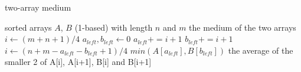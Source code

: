 \documentclass{article}
\begin{document}
	\begin{algorithm}[!h]
		\caption{two-array medium}  
		\label{whatever}  
		\begin{algorithmic}
			\Require  
			sorted arrays $A$, $B$ (1-based) with length $n$ and $m$
			\Ensure  
			the medium of the two arrays 
			\State $i\gets (m+n+1)/4$
			\State $a_{left}, b_{left}\gets 0$
			\State $a_{left} += i+1$
			\Else  
			\State $b_{left} += i+1$
			\EndIf
			\State $i\gets(n+m-a_{left}-b_{left}+1)/4$
			\EndWhile
			\State\Return $min(A[a_{left}], B[b_{left}])$
			\Else
			\State\Return the average of the smaller 2 of A[i], A[i+1], B[i] and B[i+1]
			\EndIf
		\end{algorithmic}  
	\end{algorithm}
\end{document}
